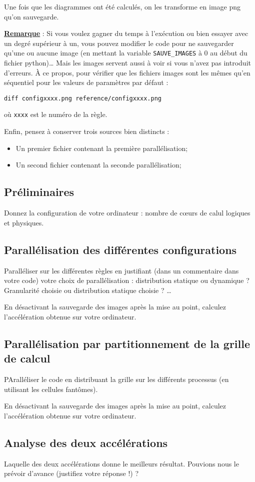 \documentclass[11pt]{article}
\begin{document}
Une fois que les diagrammes ont été calculés, on les transforme en image png qu'on sauvegarde.

\underline{\textbf{Remarque}} : Si vous voulez gagner du temps à l'exécution ou bien essayer avec un degré supérieur à un, vous pouvez modifier
le code pour ne sauvegarder qu'une ou aucune image (en mettant la variable \texttt{SAUVE\_IMAGES} à 0 au début du fichier python)\ldots
Mais les images servent aussi à voir si vous n'avez pas introduit d'erreurs. À ce propos,
pour vérifier que les fichiers images sont les mêmes qu'en séquentiel pour les valeurs de paramètres par défaut :
\begin{verbatim}
diff configxxxx.png reference/configxxxx.png
\end{verbatim}
où \texttt{xxxx} est le numéro de la règle.

Enfin, pensez à conserver trois sources bien distincts :
\begin{itemize}
\item Un premier fichier contenant la première parallélisation;
\item Un second fichier contenant la seconde parallélisation;
\end{itemize}

\subsection{Préliminaires}

Donnez la configuration de votre ordinateur : nombre de c{\oe}urs de calul logiques et physiques.

\subsection{Parallélisation des différentes configurations}

Paralléliser sur les différentes règles en justifiant (dans un commentaire dans votre code) votre choix de parallélisation : distribution statique ou dynamique ?  Granularité choisie ou
distribution statique choisie ? \ldots

En désactivant la sauvegarde des images après la mise au point, calculez l'accélération obtenue sur votre ordinateur.

\subsection{Parallélisation par partitionnement de la grille de calcul}

PAralléliser le code en distribuant la grille sur les différents processus (en utilisant les cellules fantômes).

En désactivant la sauvegarde des images après la mise au point, calculez l'accélération obtenue sur votre ordinateur.

\subsection{Analyse des deux accélérations}

Laquelle des deux accélérations donne le meilleurs résultat. Pouvions nous le prévoir d'avance (justifiez votre réponse !) ? 
\end{document}
